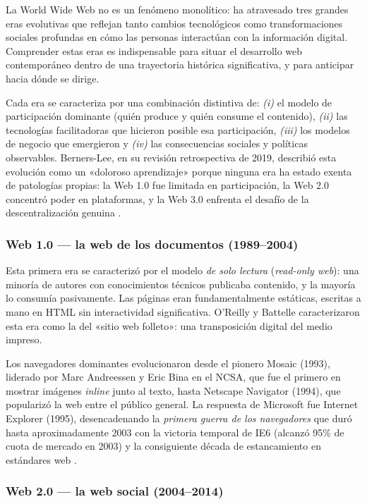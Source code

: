 La World Wide Web no es un fenómeno monolítico: ha atravesado tres
grandes eras evolutivas que reflejan tanto cambios tecnológicos como
transformaciones sociales profundas en cómo las personas interactúan
con la información digital. Comprender estas eras es indispensable
para situar el desarrollo web contemporáneo dentro de una trayectoria
histórica significativa, y para anticipar hacia dónde se dirige.

Cada era se caracteriza por una combinación distintiva de:
\emph{(i)} el modelo de participación dominante (quién produce y quién
consume el contenido), \emph{(ii)} las tecnologías facilitadoras que
hicieron posible esa participación, \emph{(iii)} los modelos de
negocio que emergieron y \emph{(iv)} las consecuencias sociales y
políticas observables. Berners-Lee, en su revisión retrospectiva de
2019, describió esta evolución como un «doloroso aprendizaje»
porque ninguna era ha estado exenta de patologías propias: la Web 1.0
fue limitada en participación, la Web 2.0 concentró poder en
plataformas, y la Web 3.0 enfrenta el desafío de la
descentralización genuina \cite{bernerslee2019contract}.

\subsubsection{Web 1.0 --- la web de los documentos (1989--2004)}

Esta primera era se caracterizó por el modelo \emph{de solo lectura}
(\emph{read-only web}): una minoría de autores con conocimientos
técnicos publicaba contenido, y la mayoría lo consumía pasivamente.
Las páginas eran fundamentalmente estáticas, escritas a mano en HTML
sin interactividad significativa. O'Reilly y Battelle
\cite{oreilly2009web2} caracterizaron esta era como la del «sitio web
folleto»: una transposición digital del medio impreso.

Los navegadores dominantes evolucionaron desde el pionero Mosaic
(1993), liderado por Marc Andreessen y Eric Bina en el NCSA, que fue
el primero en mostrar imágenes \emph{inline} junto al texto, hasta
Netscape Navigator (1994), que popularizó la web entre el público
general. La respuesta de Microsoft fue Internet Explorer (1995),
desencadenando la \emph{primera guerra de los navegadores} que duró
hasta aproximadamente 2003 con la victoria temporal de IE6 (alcanzó
95\% de cuota de mercado en 2003) y la consiguiente década de
estancamiento en estándares web \cite{zeldman2010designing}.

\subsubsection{Web 2.0 --- la web social (2004--2014)}

